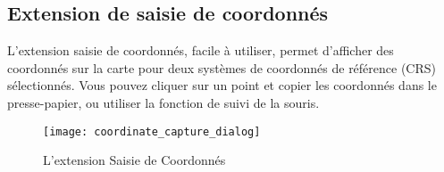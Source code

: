 \subsection{Extension de saisie de coordonnés}



L'extension saisie de coordonnés, facile à utiliser, permet 
d'afficher des coordonnés sur la carte pour deux systèmes de 
coordonnés de référence (CRS) sélectionnés. Vous pouvez cliquer 
sur un point et copier les coordonnés dans le presse-papier, ou 
utiliser la fonction de suivi de la souris.


\begin{figure}[ht]
   \begin{center}
   \caption{L'extension Saisie de Coordonnés \nixcaption}\label{fig:coordinate_capture_dialog}\smallskip
   \texttt{[image: coordinate\_capture\_dialog]}
\end{center}  
\end{figure}

